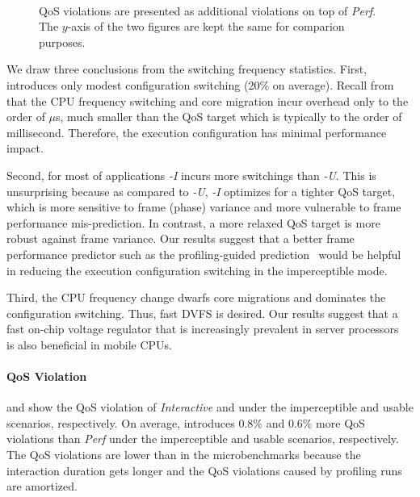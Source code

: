 \begin{figure}[p]
\centering
{}\\
\vspace*{25pt}
\caption{QoS violations are presented as additional violations on top of \textit{Perf}. The $y$-axis of the two figures are kept the same for comparion purposes.}
\label{fig:full_results}
\end{figure}

We draw three conclusions from the switching frequency statistics. First, \ebs introduces only modest configuration switching (20\% on average). Recall from  that the CPU frequency switching and core migration incur overhead only to the order of $\mu$s, much smaller than the QoS target which is typically to the order of millisecond. Therefore, the execution configuration has minimal performance impact.

Second, for most of applications \textit{\ebs-I} incurs more switchings than \textit{\ebs-U}. This is unsurprising because as compared to \textit{\ebs-U}, \textit{\ebs-I} optimizes for a tighter QoS target, which is more sensitive to frame (phase) variance and more vulnerable to frame performance mis-prediction. In contrast, a more relaxed QoS target is more robust against frame variance. Our results suggest that a better frame performance predictor such as the profiling-guided prediction~\cite{pgdvfs} would be helpful in reducing the execution configuration switching in the imperceptible mode.

Third, the CPU frequency change dwarfs core migrations and dominates the configuration switching. Thus, fast DVFS is desired. Our results suggest that a fast on-chip voltage regulator that is increasingly prevalent in server processors~\cite{fivr,ivr} is also beneficial in mobile CPUs.

\paragraph{QoS Violation}  and  show the QoS violation of \textit{Interactive} and \ebs under the imperceptible and usable scenarios, respectively. On average, \ebs introduces 0.8\% and 0.6\% more QoS violations than \textit{Perf} under the imperceptible and usable scenarios, respectively. The QoS violations are lower than in the microbenchmarks because the interaction duration gets longer and the QoS violations caused by profiling runs are amortized.

